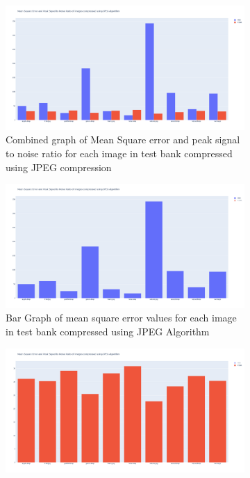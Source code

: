 \documentclass{l4proj}
\begin{document}
\begin{appendices}
\begin{figure}[!h]
    \centering
    \begin{subfigure}[b]{0.55\textwidth}
        \centering
        \includegraphics[width=\linewidth]{images/mse_psnr_combined.png}
        \caption{Combined graph of Mean Square error and peak signal to noise ratio for each image in test bank compressed using JPEG compression}
        \label{fig:compress_mse_and_psnr}
    \end{subfigure}
    \begin{subfigure}[b]{0.55\textwidth}
        \centering
        \includegraphics[width=\linewidth]{images/mse_only.png}
        \caption{Bar Graph of mean square error values for each image in test bank compressed using JPEG Algorithm}
        \label{fig:compress_mse}
    \end{subfigure}
    \begin{subfigure}[b]{0.55\textwidth}
        \centering
        \includegraphics[width=\linewidth]{images/psnr_only.png}

\end{subfigure}
\end{figure}
\end{appendices}
\end{document}
